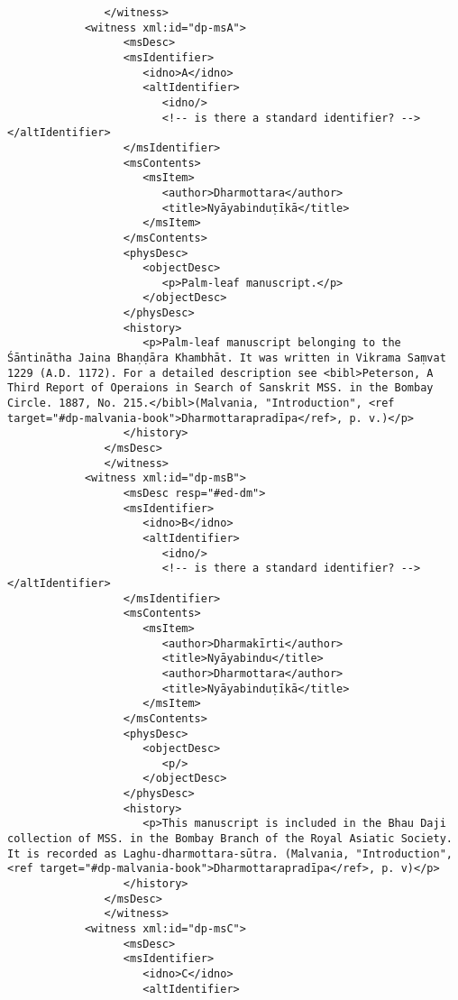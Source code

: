 \documentclass[article,12pt,a4paper]{memoir}
\begin{document}
\begin{verbatim}
	           </witness>
            <witness xml:id="dp-msA">
	              <msDesc>
                  <msIdentifier>
                     <idno>A</idno>
                     <altIdentifier>
                        <idno/>
                        <!-- is there a standard identifier? --></altIdentifier>
                  </msIdentifier>
                  <msContents>
                     <msItem>
                        <author>Dharmottara</author>
                        <title>Nyāyabinduṭīkā</title>
                     </msItem>
                  </msContents>
                  <physDesc>
                     <objectDesc>
                        <p>Palm-leaf manuscript.</p>
                     </objectDesc>
                  </physDesc>
                  <history>
                     <p>Palm-leaf manuscript belonging to the Śāntinātha Jaina Bhaṇḍāra Khambhāt. It was written in Vikrama Saṃvat 1229 (A.D. 1172). For a detailed description see <bibl>Peterson, A Third Report of Operaions in Search of Sanskrit MSS. in the Bombay Circle. 1887, No. 215.</bibl>(Malvania, "Introduction", <ref target="#dp-malvania-book">Dharmottarapradīpa</ref>, p. v.)</p>
                  </history>
               </msDesc>
	           </witness>
            <witness xml:id="dp-msB">
	              <msDesc resp="#ed-dm">
                  <msIdentifier>
                     <idno>B</idno>
                     <altIdentifier>
                        <idno/>
                        <!-- is there a standard identifier? --></altIdentifier>
                  </msIdentifier>
                  <msContents>
                     <msItem>
                        <author>Dharmakīrti</author>
                        <title>Nyāyabindu</title>
                        <author>Dharmottara</author>
                        <title>Nyāyabinduṭīkā</title>
                     </msItem>
                  </msContents>
                  <physDesc>
                     <objectDesc>
                        <p/>
                     </objectDesc>
                  </physDesc>
                  <history>
                     <p>This manuscript is included in the Bhau Daji collection of MSS. in the Bombay Branch of the Royal Asiatic Society. It is recorded as Laghu-dharmottara-sūtra. (Malvania, "Introduction", <ref target="#dp-malvania-book">Dharmottarapradīpa</ref>, p. v)</p>
                  </history>
               </msDesc>
	           </witness>
            <witness xml:id="dp-msC">
	              <msDesc>
                  <msIdentifier>
                     <idno>C</idno>
                     <altIdentifier>

\end{verbatim}
\end{document}
